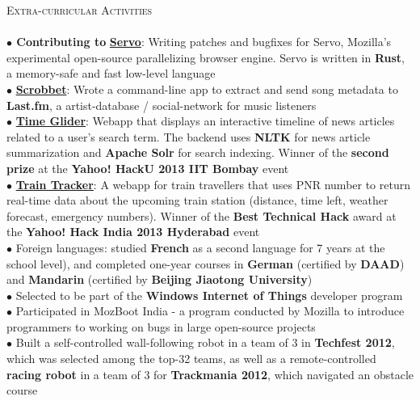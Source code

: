 \documentclass[a4paper,9pt]{article}
\begin{document}
\textcolor{myrust}{\large{\textsc{Extra-curricular Activities}}}\textcolor{mygray}{\sout{\hfill}}\\\\
\normalsize
\textbf{$\bullet$ Contributing to} \href{https://github.com/servo/servo}{\textbf{Servo}}: Writing patches and bugfixes for Servo, Mozilla's experimental open-source parallelizing browser engine. Servo is written in \textbf{Rust}, a memory-safe and fast low-level language\\
\textbf{$\bullet$} \href{https://github.com/wenderen/scrobbet}{\textbf{Scrobbet}}: Wrote a command-line app to extract and send song metadata to \textbf{Last.fm}, a artist-database / social-network for music listeners\\
\textbf{$\bullet$} \href{https://github.com/wenderen/timeline-builder}{\textbf{Time Glider}}: Webapp that displays an interactive timeline of news articles related to a user's search term. The backend uses \textbf{NLTK} for news article summarization and \textbf{Apache Solr} for search indexing. Winner of the \textbf{second prize} at the \textbf{Yahoo! HackU 2013 IIT Bombay} event\\
\textbf{$\bullet$} \href{https://github.com/wenderen/train-tracker}{\textbf{Train Tracker}}: A webapp for train travellers that uses PNR number to return real-time data about the upcoming train station (distance, time left, weather forecast, emergency numbers). Winner of the \textbf{Best Technical Hack} award at the \textbf{Yahoo! Hack India 2013 Hyderabad} event\\
$\bullet$ Foreign languages: studied \textbf{French} as a second language for 7 years at the school level), and completed one-year courses in \textbf{German} (certified by \textbf{DAAD}) and \textbf{Mandarin} (certified by \textbf{Beijing Jiaotong University})\\
$\bullet$ Selected to be part of the \textbf{Windows Internet of Things} developer program\\
$\bullet$ Participated in MozBoot India - a program conducted by Mozilla to introduce programmers to working on bugs in large open-source projects\\
$\bullet$ Built a self-controlled wall-following robot in a team of 3 in \textbf{Techfest 2012}, which was selected among the top-32 teams, as well as a remote-controlled \textbf{racing robot} in a team of 3 for \textbf{Trackmania 2012}, which navigated an obstacle course\\
\end{document}
